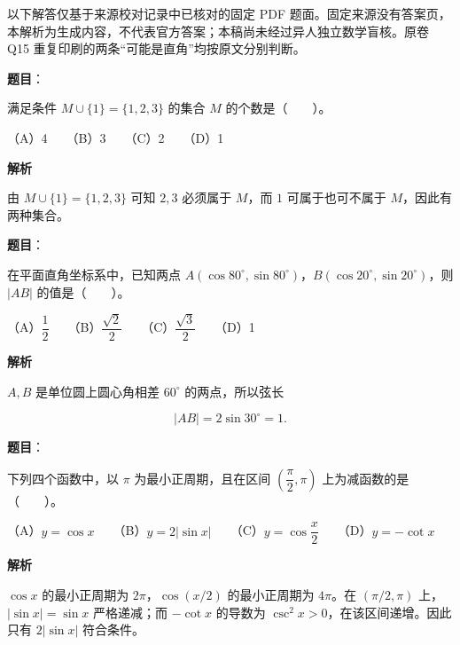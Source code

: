 

\begin{gktip}
以下解答仅基于来源校对记录中已核对的固定 PDF 题面。固定来源没有答案页，本解析为生成内容，不代表官方答案；本稿尚未经过异人独立数学盲核。原卷 Q15 重复印刷的两条“可能是直角”均按原文分别判断。
\end{gktip}


\begin{answer}

\textbf{题目}：

满足条件 \(M\cup\{1\}=\{1,2,3\}\) 的集合 \(M\) 的个数是\mbox{（　　）}。

（A）4　　（B）3　　（C）2　　（D）1

\textbf{解析}

由 $M\cup\{1\}=\{1,2,3\}$ 可知 $2,3$ 必须属于 $M$，而 $1$ 可属于也可不属于 $M$，因此有两种集合。


\end{answer}
\begin{answer}

\textbf{题目}：

在平面直角坐标系中，已知两点 \(A(\cos80^\circ,\sin80^\circ)\)，\(B(\cos20^\circ,\sin20^\circ)\)，则 \(|AB|\) 的值是\mbox{（　　）}。

（A）\(\dfrac12\)　　（B）\(\dfrac{\sqrt2}{2}\)　　（C）\(\dfrac{\sqrt3}{2}\)　　（D）1

\textbf{解析}

$A,B$ 是单位圆上圆心角相差 $60^\circ$ 的两点，所以弦长

\nopagebreak[4]
\[|AB|=2\sin30^\circ=1.\]


\end{answer}
\begin{answer}

\textbf{题目}：

下列四个函数中，以 \(\pi\) 为最小正周期，且在区间 \(\left(\dfrac\pi2,\pi\right)\) 上为减函数的是\mbox{（　　）}。

（A）\(y=\cos x\)　　（B）\(y=2|\sin x|\)　　（C）\(y=\cos\dfrac{x}{2}\)　　（D）\(y=-\cot x\)

\textbf{解析}

$\cos x$ 的最小正周期为 $2\pi$，$\cos(x/2)$ 的最小正周期为 $4\pi$。在 $(\pi/2,\pi)$ 上，$|\sin x|=\sin x$ 严格递减；而 $-\cot x$ 的导数为 $\csc^2x>0$，在该区间递增。因此只有 $2|\sin x|$ 符合条件。


\end{answer}
